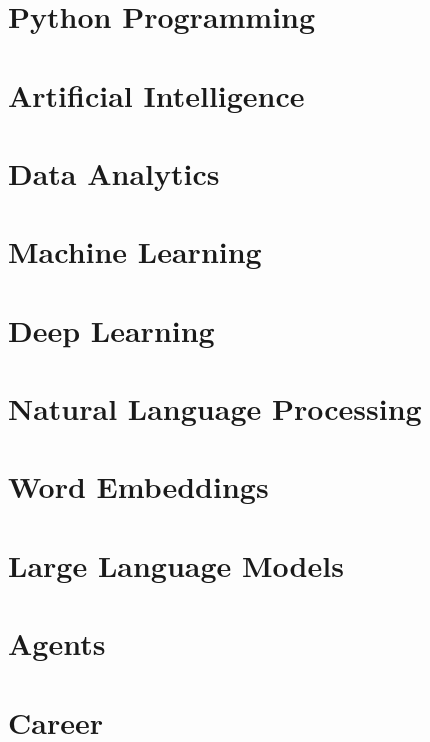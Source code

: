 \section[Python]{Python Programming}


\section[AI]{Artificial Intelligence}


\section[Data]{Data Analytics}



\section[ML]{Machine Learning}



\section[DL]{Deep Learning}



\section[NLP]{Natural Language Processing}


\section[Word2Vec]{Word Embeddings}



\section[LLM]{Large Language Models}


\section[Agents]{Agents}


\section[Career]{Career}
